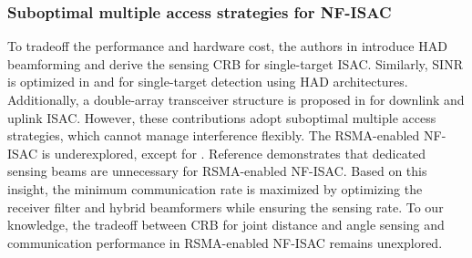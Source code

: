  \subsubsection{Suboptimal multiple access strategies for NF-ISAC} To tradeoff the performance and hardware cost, the authors in \cite{10135096} introduce HAD beamforming and derive the sensing CRB for single-target ISAC. Similarly, SINR is optimized in \cite{meng2024hybrid} and \cite{10700785} 
 for single-target detection using HAD architectures. Additionally, a double-array transceiver structure is proposed in \cite{10579914}  for downlink and uplink ISAC. However, these contributions adopt suboptimal multiple access strategies, which cannot manage interference flexibly\cite{10135096, meng2024hybrid, 10700785, 10579914}. The RSMA-enabled NF-ISAC is underexplored, except for \cite{zhou2024hybrid}. Reference \cite{zhou2024hybrid} demonstrates that dedicated sensing beams are unnecessary for RSMA-enabled NF-ISAC. Based on this insight, the minimum communication rate is maximized by optimizing the receiver filter and hybrid beamformers while ensuring the sensing rate. To our knowledge, the tradeoff between CRB for joint distance and angle sensing and communication performance in RSMA-enabled NF-ISAC remains unexplored.
